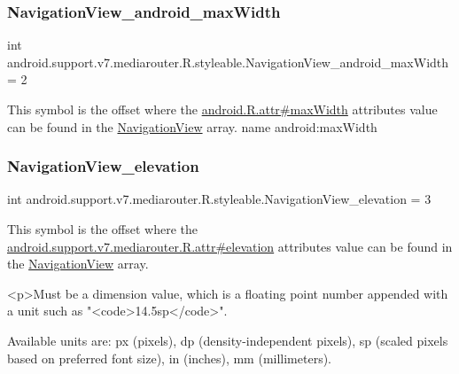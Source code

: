 \subsubsection{\texorpdfstring{Navigation\+View\+\_\+android\+\_\+max\+Width}{NavigationView\_android\_maxWidth}}
{\footnotesize\ttfamily int android.\+support.\+v7.\+mediarouter.\+R.\+styleable.\+Navigation\+View\+\_\+android\+\_\+max\+Width = 2\hspace{0.3cm}{\ttfamily [static]}}

This symbol is the offset where the \hyperlink{}{android.\+R.\+attr\#max\+Width} attribute\textquotesingle{}s value can be found in the \hyperlink{classandroid_1_1support_1_1v7_1_1mediarouter_1_1R_1_1styleable_a9216c77e145f14d4fdd264c2381fce44}{Navigation\+View} array.  name android\+:max\+Width \mbox{\label{classandroid_1_1support_1_1v7_1_1mediarouter_1_1R_1_1styleable_a9adfb6c1531f42fcb13fc779ad226cba}} 
\subsubsection{\texorpdfstring{Navigation\+View\+\_\+elevation}{NavigationView\_elevation}}
{\footnotesize\ttfamily int android.\+support.\+v7.\+mediarouter.\+R.\+styleable.\+Navigation\+View\+\_\+elevation = 3\hspace{0.3cm}{\ttfamily [static]}}

This symbol is the offset where the \hyperlink{classandroid_1_1support_1_1v7_1_1mediarouter_1_1R_1_1attr_ab1ec64066729d67ab6ae697dc2178d06}{android.\+support.\+v7.\+mediarouter.\+R.\+attr\#elevation} attribute\textquotesingle{}s value can be found in the \hyperlink{classandroid_1_1support_1_1v7_1_1mediarouter_1_1R_1_1styleable_a9216c77e145f14d4fdd264c2381fce44}{Navigation\+View} array.

\begin{DoxyVerb}      <p>Must be a dimension value, which is a floating point number appended with a unit such as "<code>14.5sp</code>".
\end{DoxyVerb}
 Available units are\+: px (pixels), dp (density-\/independent pixels), sp (scaled pixels based on preferred font size), in (inches), mm (millimeters). 

